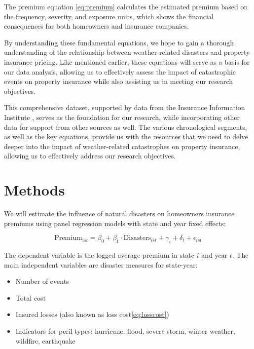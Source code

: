 \documentclass[12pt]{article}
\begin{document}
The premium equation \ref{eq:premium} calculates the estimated premium based on the frequency, severity, and exposure units, which 
shows the financial consequences for both homeowners and insurance companies.

By understanding these fundamental equations, we hope to gain a thorough understanding of the relationship between weather-related disasters 
and property insurance pricing. Like mentioned earlier, these equations will serve as a basis for our data analysis, allowing us to 
effectively assess the impact of catastrophic events on property insurance while also assisting us in meeting our research objectives.

This comprehensive dataset, supported by data from the Insurance Information Institute \cite{iii}, serves as the foundation 
for our research, while incorporating other data for support from other sources as well. The various chronological segments, as well 
as the key equations, provide us with the resources that we need to delve deeper into the impact of weather-related catastrophes on 
property insurance, allowing us to effectively address our research objectives. 



\section{Methods}
\label{sec:meth}
We will estimate the influence of natural disasters on homeowners insurance premiums using panel regression models with state and year 
fixed effects:

\begin{equation} 
    \mathrm{Premium}_{ist} = \beta_0 + \beta_1 \cdot \mathrm{Disasters}_{ist} + \gamma_i + \delta_t + \epsilon_{ist}
\end{equation}

The dependent variable is the logged average premium in state $i$ and year $t$. The main independent variables are disaster measures 
for state-year:

\begin{itemize} 
    \item Number of events 
    \item Total cost 
    \item Insured losses (also known as loss cost\ref{eq:losscost})
    \item Indicators for peril types: hurricane, flood, severe storm, winter weather, wildfire, earthquake 
\end{itemize}
\end{document}
